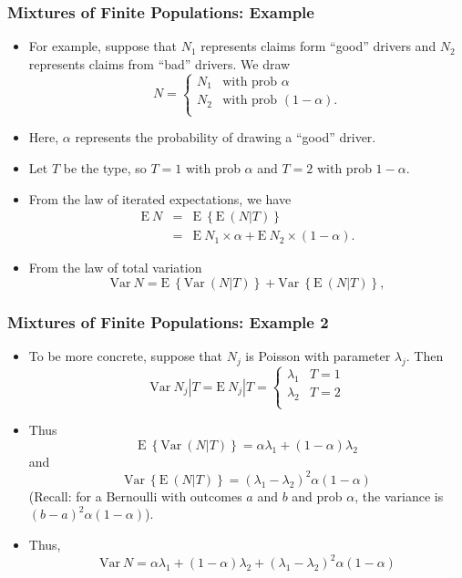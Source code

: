 \documentclass{beamer}
\begin{document}
\begin{frame}[shrink=2]
\frametitle{Mixtures of Finite Populations: Example}
\begin{itemize}
\item For example, suppose that $N_1$ represents claims form ``good'' drivers and $N_2$ represents claims from ``bad'' drivers. We draw
\begin{equation*}
N =
\begin{cases}
N_1  &  \text{with prob~}\alpha\\
N_2  &   \text{with prob~}(1-\alpha) .\\
\end{cases}
\end{equation*}
\item Here, $\alpha$ represents the probability of drawing a ``good'' driver.
\item Let $T$ be the type, so $T=1$ with prob $\alpha$ and $T=2$ with prob $1-\alpha$.
\item From the law of iterated expectations, we have
\begin{eqnarray*}\mathrm{E~} N &=& \mathrm{E~} \left\{ \mathrm{E~} \left( N | T \right) \right \} \\
 &=& \mathrm{E~} N_1 \times \alpha +  \mathrm{E~} N_2 \times (1-\alpha).
\end{eqnarray*}
\item From the law of total variation
$$\mathrm{Var~} N= \mathrm{E~} \left\{ \mathrm{Var~} \left( N | T \right) \right \}
+\mathrm{Var~} \left\{ \mathrm{E~} \left( N | T \right) \right \}, $$
 \end{itemize}
\end{frame}

\begin{frame}[shrink=2]
 \frametitle{Mixtures of Finite Populations: Example 2}
\begin{itemize}
   \item To be more concrete, suppose that $N_j$ is Poisson with parameter $\lambda_j$. Then
\begin{equation*}
\mathrm{Var~} N_j|T= \mathrm{E~} N_j|T =
\begin{cases}
\lambda_1  &  T=1\\
\lambda_2  &  T=2\\
\end{cases}
\end{equation*}
\item Thus
$$\mathrm{E~} \left\{ \mathrm{Var~} \left( N | T \right) \right \} = \alpha \lambda_1+ (1-\alpha) \lambda_2$$
and
$$\mathrm{Var~} \left\{ \mathrm{E~} \left( N | T \right) \right \} = (\lambda_1-\lambda_2)^2 \alpha (1-\alpha)$$
(Recall: for a Bernoulli with outcomes $a$ and $b$ and prob $\alpha$, the variance is $(b-a)^2\alpha(1-\alpha)$).
\item Thus,
$$\mathrm{Var~} N= \alpha \lambda_1+ (1-\alpha) \lambda_2 + (\lambda_1-\lambda_2)^2 \alpha (1-\alpha)$$
 \end{itemize}
\end{frame}

 
\end{document}
